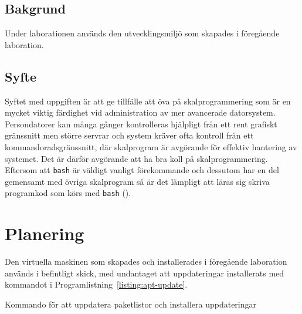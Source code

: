 \subsection{Bakgrund}
Under laborationen används den utvecklingsmiljö som skapades i föregående
laboration.


\subsection{Syfte}
Syftet med uppgiften är att ge tillfälle att öva på skalprogrammering som är en
mycket viktig färdighet vid administration av mer avancerade datorsystem.
Persondatorer kan många gånger kontrolleras hjälpligt från ett rent grafiskt
gränssnitt men större servrar och system kräver ofta kontroll från ett
kommandoradsgränssnitt, där skalprogram är avgörande för effektiv hantering av
systemet.  Det är därför avgörande att ha bra koll på skalprogrammering.
Eftersom att \texttt{bash} är väldigt vanligt förekommande och dessutom har en
del gemensamt med övriga skalprogram så är det lämpligt att läras sig skriva
programkod som körs med \texttt{bash} (\cite{forelasning02}).



\section{Planering}
Den virtuella maskinen som skapades och installerades i föregående laboration
används i befintligt skick, med undantaget att uppdateringar installerats med
kommandot i Programlistning~\ref{listing:apt-update}.

\begin{listing}[H]
\caption{Kommando för att uppdatera paketlistor och installera uppdateringar}
\label{listing:apt-update}
\end{listing}


